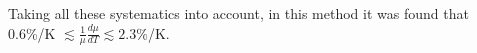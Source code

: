


Taking all these systematics into account, in this method it was found that 0.6\%/K
$\lesssim\frac{1}{\mu}\frac{d\mu}{dT}\lesssim 2.3\%$/K. 



